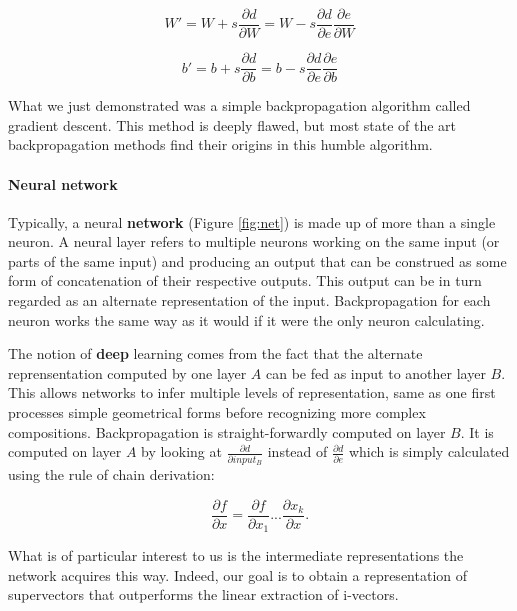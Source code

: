 \documentclass[conference]{IEEEtran}
\begin{document}
\begin{equation}
  W'=W + s\frac{\partial d}{\partial W}=W-s\frac{\partial d}{\partial e}\frac{\partial e}{\partial W}
  \label{eq:W}
\end{equation}

\begin{equation}
  b'=b + s\frac{\partial d}{\partial b}=b-s\frac{\partial d}{\partial e}\frac{\partial e}{\partial b}
  \label{eq:b}
\end{equation}

What we just demonstrated was a simple backpropagation algorithm called gradient
descent. This method is deeply flawed, but most state of the art backpropagation
methods find their origins in this humble algorithm.

\paragraph{Neural network}

Typically, a neural \textbf{network} (Figure \ref{fig:net}) is made up of more than a single neuron. A
neural layer refers to multiple neurons working on the same input (or parts of
the same input) and producing an output that can be construed as some form of
concatenation of their respective outputs. This output can be in turn regarded
as an alternate representation of the input. Backpropagation for each neuron
works the same way as it would if it were the only neuron calculating.

The notion of \textbf{deep} learning comes from the fact that the alternate
reprensentation computed by one layer $A$ can be fed as input to another layer $B$.
This allows networks to infer multiple levels of representation, same as one
first processes simple geometrical forms before recognizing more complex
compositions. Backpropagation is straight-forwardly computed on layer $B$. It is
computed on layer $A$ by looking at $\frac{\partial d}{\partial input_B}$
instead of $\frac{\partial d}{\partial e}$ which is simply calculated using the
rule of chain derivation:

\begin{equation}
  \frac{\partial f}{\partial x}=\frac{\partial f}{\partial x_1}...\frac{\partial x_k}{\partial x}.
\end{equation}

What is of particular interest to us is the intermediate representations the
network acquires this way. Indeed, our goal is to obtain a representation of
supervectors that outperforms the linear extraction of i-vectors.
\end{document}
